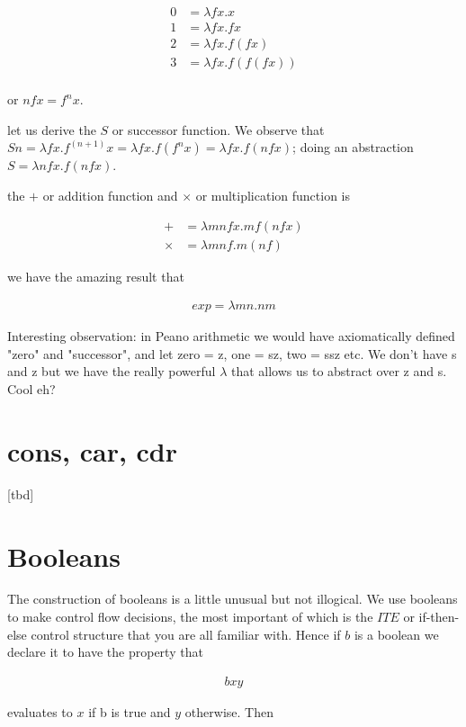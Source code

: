 \documentclass{article}
\begin{document}
\begin{align}
0 &= \lambda fx. x \\
1 &= \lambda fx. f x \\
2 &= \lambda fx. f (f x) \\
3 &= \lambda fx. f (f (f x)) \\
\end{align}

or $nfx = f^nx$.

let us derive the $S$ or successor function. We observe that $Sn = \lambda fx.f^{(n+1)}x = \lambda fx.f(f^nx) = \lambda fx.f(nfx)$; doing an abstraction $S = \lambda nfx.f(nfx)$.

the $+$ or addition function and $\times$ or multiplication function is 

\begin{align}
+ &= \lambda mnfx.mf(nfx) \\
\times &= \lambda mnf. m(nf)
\end{align}

we have the amazing result that

\begin{align}
exp = \lambda mn. nm
\end{align}

Interesting observation: in Peano arithmetic we would have axiomatically defined "zero" and "successor", and let zero = z, one = sz, two = ssz etc. We don't have s and z but we have the really powerful $\lambda$ that allows us to abstract over z and s. Cool eh?

\section{cons, car, cdr}

[tbd]

\section{Booleans}

The construction of booleans is a little unusual but not illogical. We use booleans to make control flow decisions, the most important of which is the $ITE$ or if-then-else control structure that you are all familiar with. Hence if $b$ is a boolean we declare it to have the property that

\begin{align}
b x y
\end{align}

evaluates to $x$ if b is true and $y$ otherwise. Then
\end{document}
